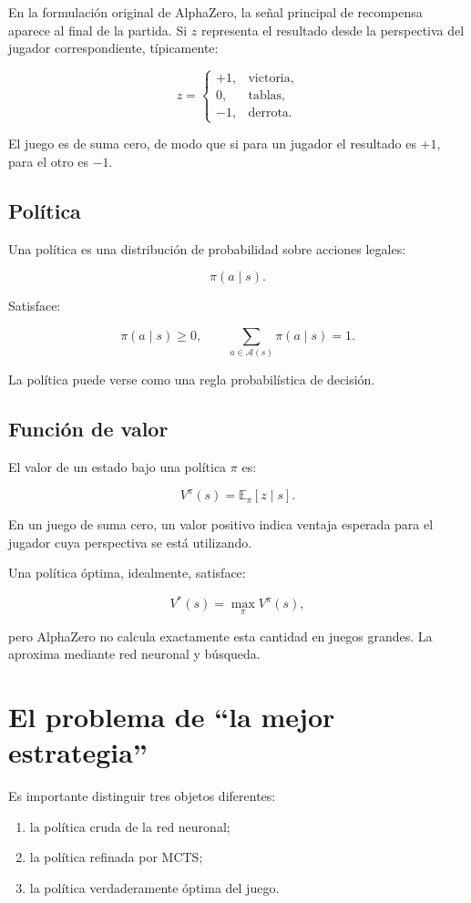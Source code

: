 \documentclass[11pt,a4paper]{article}
\newcommand{\E}{\mathbb{E}}
\begin{document}
En la formulación original de AlphaZero, la señal principal de recompensa aparece al final de la partida. Si \(z\) representa el resultado desde la perspectiva del jugador correspondiente, típicamente:

\[
z =
\begin{cases}
+1, & \text{victoria},\\
0, & \text{tablas},\\
-1, & \text{derrota}.
\end{cases}
\]

El juego es de suma cero, de modo que si para un jugador el resultado es \(+1\), para el otro es \(-1\).

\subsection{Política}

Una política es una distribución de probabilidad sobre acciones legales:

\[
\pi(a\mid s).
\]

Satisface:

\[
\pi(a\mid s)\ge 0,
\qquad
\sum_{a\in \mathcal{A}(s)}\pi(a\mid s)=1.
\]

La política puede verse como una regla probabilística de decisión.

\subsection{Función de valor}

El valor de un estado bajo una política \(\pi\) es:

\[
V^\pi(s)
=
\E_\pi[z\mid s].
\]

En un juego de suma cero, un valor positivo indica ventaja esperada para el jugador cuya perspectiva se está utilizando.

Una política óptima, idealmente, satisface:

\[
V^*(s)
=
\max_\pi V^\pi(s),
\]

pero AlphaZero no calcula exactamente esta cantidad en juegos grandes. La aproxima mediante red neuronal y búsqueda.

\section{El problema de ``la mejor estrategia''}

Es importante distinguir tres objetos diferentes:

\begin{enumerate}
    \item la política cruda de la red neuronal;
    \item la política refinada por MCTS;
    \item la política verdaderamente óptima del juego.
\end{enumerate}
\end{document}
